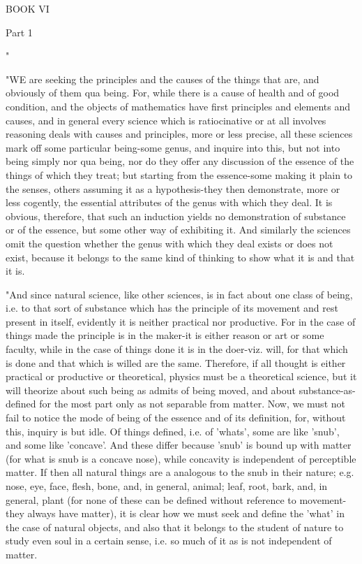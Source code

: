 BOOK VI

Part 1 

"

"WE are seeking the principles and the causes of the things that are,
and obviously of them qua being. For, while there is a cause of health
and of good condition, and the objects of mathematics have first principles
and elements and causes, and in general every science which is ratiocinative
or at all involves reasoning deals with causes and principles, more
or less precise, all these sciences mark off some particular being-some
genus, and inquire into this, but not into being simply nor qua being,
nor do they offer any discussion of the essence of the things of which
they treat; but starting from the essence-some making it plain to
the senses, others assuming it as a hypothesis-they then demonstrate,
more or less cogently, the essential attributes of the genus with
which they deal. It is obvious, therefore, that such an induction
yields no demonstration of substance or of the essence, but some other
way of exhibiting it. And similarly the sciences omit the question
whether the genus with which they deal exists or does not exist, because
it belongs to the same kind of thinking to show what it is and that
it is. 

"And since natural science, like other sciences, is in fact about
one class of being, i.e. to that sort of substance which has the principle
of its movement and rest present in itself, evidently it is neither
practical nor productive. For in the case of things made the principle
is in the maker-it is either reason or art or some faculty, while
in the case of things done it is in the doer-viz. will, for that which
is done and that which is willed are the same. Therefore, if all thought
is either practical or productive or theoretical, physics must be
a theoretical science, but it will theorize about such being as admits
of being moved, and about substance-as-defined for the most part only
as not separable from matter. Now, we must not fail to notice the
mode of being of the essence and of its definition, for, without this,
inquiry is but idle. Of things defined, i.e. of 'whats', some are
like 'snub', and some like 'concave'. And these differ because 'snub'
is bound up with matter (for what is snub is a concave nose), while
concavity is independent of perceptible matter. If then all natural
things are a analogous to the snub in their nature; e.g. nose, eye,
face, flesh, bone, and, in general, animal; leaf, root, bark, and,
in general, plant (for none of these can be defined without reference
to movement-they always have matter), it is clear how we must seek
and define the 'what' in the case of natural objects, and also that
it belongs to the student of nature to study even soul in a certain
sense, i.e. so much of it as is not independent of matter.

